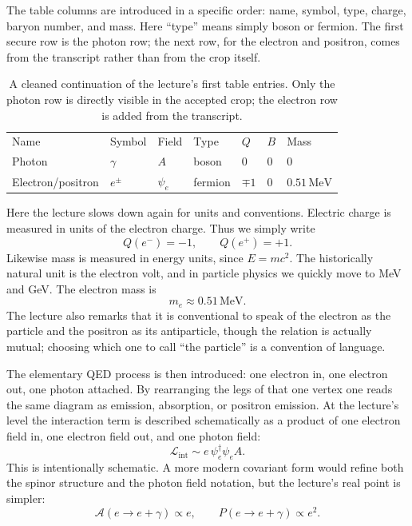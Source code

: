 The table columns are introduced in a specific order: name, symbol, type, charge, baryon number, and mass. Here ``type'' means simply boson or fermion. The first secure row is the photon row; the next row, for the electron and positron, comes from the transcript rather than from the crop itself.

\begin{table}[h]
\centering
\begin{tabular}{lllllll}
Name & Symbol & Field & Type & \(Q\) & \(B\) & Mass \\
Photon & \(\gamma\) & \(A\) & boson & \(0\) & \(0\) & \(0\) \\
Electron/positron & \(e^\pm\) & \(\psi_e\) & fermion & \(\mp 1\) & \(0\) & \(0.51\,\mathrm{MeV}\)
\end{tabular}
\caption{A cleaned continuation of the lecture's first table entries. Only the photon row is directly visible in the accepted crop; the electron row is added from the transcript.}
\end{table}

Here the lecture slows down again for units and conventions. Electric charge is measured in units of the electron charge. Thus we simply write
\begin{equation}
Q(e^-)=-1,\qquad Q(e^+)=+1.
\end{equation}
Likewise mass is measured in energy units, since \(E=mc^2\). The historically natural unit is the electron volt, and in particle physics we quickly move to MeV and GeV. The electron mass is
\begin{equation}
m_e \approx 0.51\,\mathrm{MeV}.
\end{equation}
The lecture also remarks that it is conventional to speak of the electron as the particle and the positron as its antiparticle, though the relation is actually mutual; choosing which one to call ``the particle'' is a convention of language.

The elementary QED process is then introduced: one electron in, one electron out, one photon attached. By rearranging the legs of that one vertex one reads the same diagram as emission, absorption, or positron emission. At the lecture's level the interaction term is described schematically as a product of one electron field in, one electron field out, and one photon field:
\begin{equation}
\mathcal{L}_{\mathrm{int}}\sim e\,\psi_e^\dagger \psi_e A.
\end{equation}
This is intentionally schematic. A more modern covariant form would refine both the spinor structure and the photon field notation, but the lecture's real point is simpler:
\begin{equation}
\mathcal{A}(e\to e+\gamma)\propto e,
\qquad
P(e\to e+\gamma)\propto e^2.
\end{equation}

